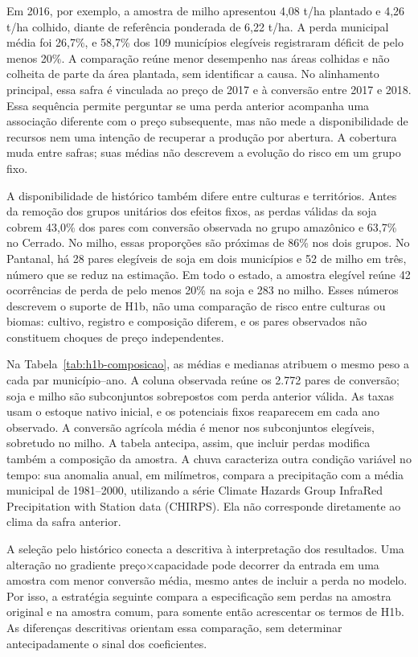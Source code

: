 Em 2016, por exemplo, a amostra de milho apresentou 4,08 t/ha plantado e 4,26 t/ha colhido, diante de referência ponderada de 6,22 t/ha. A perda municipal média foi 26,7\%, e 58,7\% dos 109 municípios elegíveis registraram déficit de pelo menos 20\%. A comparação reúne menor desempenho nas áreas colhidas e não colheita de parte da área plantada, sem identificar a causa. No alinhamento principal, essa safra é vinculada ao preço de 2017 e à conversão entre 2017 e 2018. Essa sequência permite perguntar se uma perda anterior acompanha uma associação diferente com o preço subsequente, mas não mede a disponibilidade de recursos nem uma intenção de recuperar a produção por abertura. A cobertura muda entre safras; suas médias não descrevem a evolução do risco em um grupo fixo.

A disponibilidade de histórico também difere entre culturas e territórios. Antes da remoção dos grupos unitários dos efeitos fixos, as perdas válidas da soja cobrem 43,0\% dos pares com conversão observada no grupo amazônico e 63,7\% no Cerrado. No milho, essas proporções são próximas de 86\% nos dois grupos. No Pantanal, há 28 pares elegíveis de soja em dois municípios e 52 de milho em três, número que se reduz na estimação. Em todo o estado, a amostra elegível reúne 42 ocorrências de perda de pelo menos 20\% na soja e 283 no milho. Esses números descrevem o suporte de H1b, não uma comparação de risco entre culturas ou biomas: cultivo, registro e composição diferem, e os pares observados não constituem choques de preço independentes.

Na Tabela~\ref{tab:h1b-composicao}, as médias e medianas atribuem o mesmo peso a cada par município--ano. A coluna observada reúne os 2.772 pares de conversão; soja e milho são subconjuntos sobrepostos com perda anterior válida. As taxas usam o estoque nativo inicial, e os potenciais fixos reaparecem em cada ano observado. A conversão agrícola média é menor nos subconjuntos elegíveis, sobretudo no milho. A tabela antecipa, assim, que incluir perdas modifica também a composição da amostra. A chuva caracteriza outra condição variável no tempo: sua anomalia anual, em milímetros, compara a precipitação com a média municipal de 1981--2000, utilizando a série Climate Hazards Group InfraRed Precipitation with Station data (CHIRPS). Ela não corresponde diretamente ao clima da safra anterior.



A seleção pelo histórico conecta a descritiva à interpretação dos resultados. Uma alteração no gradiente preço×capacidade pode decorrer da entrada em uma amostra com menor conversão média, mesmo antes de incluir a perda no modelo. Por isso, a estratégia seguinte compara a especificação sem perdas na amostra original e na amostra comum, para somente então acrescentar os termos de H1b. As diferenças descritivas orientam essa comparação, sem determinar antecipadamente o sinal dos coeficientes.
